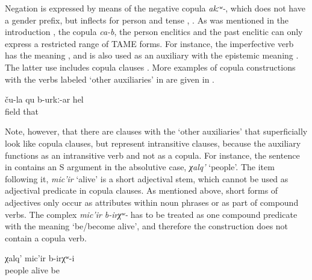 Negation is expressed by means of the negative copula \textit{akːʷ-}, which does not have a gender prefix, but inflects for person and tense , . As was mentioned in the introduction , the copula \textit{ca-b}, the person enclitics and the past enclitic can only express a restricted range of TAME forms. For instance, the imperfective verb  has the meaning , and is also used as an auxiliary with the epistemic meaning . The latter use includes copula clauses . More examples of copula constructions with the verbs labeled `other auxiliaries' in  are given in .

 \begin{exe}
 \ex	\label{That is probably their field.}
\gll ču-la	qu	b-urkː-ar	hel	\\
	field		that	\\
 \glt	{}
\end{exe}

Note, however, that there are clauses with the `other auxiliaries' that superficially look like copula clauses, but represent intransitive clauses, because the auxiliary functions as an intransitive verb and not as a copula. For instance, the sentence in  contains an S argument in the absolutive case, \textit{χalq'} `people'. The item following it, \textit{mic'ir} `alive' is a short adjectival stem, which cannot be used as adjectival predicate in copula clauses. As mentioned above, short forms of adjectives only occur as attributes within noun phrases or as part of compound verbs. The complex  \textit{mic'ir	b-irχʷ-} has to be treated as one compound predicate with the meaning `be\slash become alive', and therefore the construction does not contain a copula verb.
 
 \begin{exe}
	\ex	\label{ex:peopleusedtobealive}
	\gll	χalq'	mic'ir	b-irχʷ-i\\
		people	alive	be\\
	\glt	{}
\end{exe}



